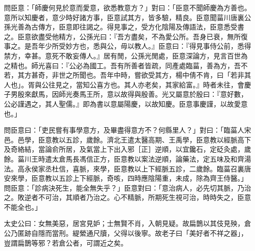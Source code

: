\begin{pinyinscope}
問臣意：「師慶何見於意而愛意，欲悉教意方？」對曰：「臣意不聞師慶為方善也。意所以知慶者，意少時好諸方事，臣意試其方，皆多驗，精良。臣意聞菑川唐裏公孫光善為古傳方，臣意即往謁之。得見事之，受方化陰陽及傳語法，臣意悉受書之。臣意欲盡受他精方，公孫光曰：『吾方盡矣，不為愛公所。吾身已衰，無所復事之。是吾年少所受妙方也，悉與公，毋以教人。』臣意曰：『得見事侍公前，悉得禁方，幸甚。意死不敢妄傳人。』居有閒，公孫光閒處，臣意深論方，見言百世為之精也。師光喜曰：『公必為國工。吾有所善者皆疏，同產處臨菑，善為方，吾不若，其方甚奇，非世之所聞也。吾年中時，嘗欲受其方，楊中倩不肯，曰「若非其人也」。胥與公往見之，當知公喜方也。其人亦老矣，其家給富。』時者未往，會慶子男殷來獻馬，因師光奏馬王所，意以故得與殷善。光又屬意於殷曰：『意好數，公必謹遇之，其人聖儒。』即為書以意屬陽慶，以故知慶。臣意事慶謹，以故愛意也。」

問臣意曰：「吏民嘗有事學意方，及畢盡得意方不？何縣里人？」對曰：「臨菑人宋邑。邑學，臣意教以五診，歲餘。濟北王遣太醫高期、王禹學，臣意教以經脈高下及奇絡結，當論俞所居，及氣當上下出入邪［正］逆順，以宜鑱石，定砭灸處，歲餘。菑川王時遣太倉馬長馮信正方，臣意教以案法逆順，論藥法，定五味及和齊湯法。高永侯家丞杜信，喜脈，來學，臣意教以上下經脈五診，二歲餘。臨菑召裏唐安來學，臣意教以五診上下經脈，奇咳，四時應陰陽重，未成，除為齊王侍醫。」問臣意：「診病決死生，能全無失乎？」臣意對曰：「意治病人，必先切其脈，乃治之。敗逆者不可治，其順者乃治之。心不精脈，所期死生視可治，時時失之，臣意不能全也。」

太史公曰：女無美惡，居宮見妒；士無賢不肖，入朝見疑。故扁鵲以其伎見殃，倉公乃匿跡自隱而當刑。緹縈通尺牘，父得以後寧。故老子曰「美好者不祥之器」，豈謂扁鵲等邪？若倉公者，可謂近之矣。


\end{pinyinscope}